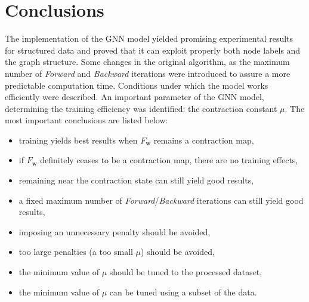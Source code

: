 
\chapter{Conclusions}
The implementation of the GNN model yielded promising experimental results for structured data and proved that it can exploit properly both node labels and the graph structure. Some changes in the original algorithm, as the maximum number of \emph{Forward} and \emph{Backward} iterations were introduced to assure a more predictable computation time. Conditions under which the model works efficiently were described. An important parameter of the GNN model, determining the training efficiency was identified: the contraction constant $\mu$. The most important conclusions are listed below:
\begin{itemize}
	\item training yields best results when $F_{\bm{w}}$ remains a contraction map,
	\item if $F_{\bm{w}}$ definitely ceases to be a contraction map, there are no training effects,
	\item remaining near the contraction state can still yield good results,
	\item a fixed maximum number of \emph{Forward}/\emph{Backward} iterations can still yield good results,
	\item imposing an unnecessary penalty should be avoided,
	\item too large penalties (a too small $\mu$) should be avoided,
	\item the minimum value of $\mu$ should be tuned to the processed dataset,
	\item the minimum value of $\mu$ can be tuned using a subset of the data.
\end{itemize}
